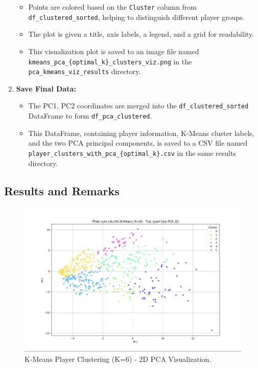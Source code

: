 \documentclass[12pt, a4paper]{report}
\begin{document}
\begin{enumerate}[label=\textbf{Step \arabic*:}, leftmargin=*]
\begin{itemize}
        \item Points are colored based on the \texttt{Cluster} column from \texttt{df\_clustered\_sorted}, helping to distinguish different player groups.
        \item The plot is given a title, axis labels, a legend, and a grid for readability.
        \item This visualization plot is saved to an image file named \texttt{kmeans\_pca\_\{optimal\_k\}\_clusters\_viz.png} in the \texttt{pca\_kmeans\_viz\_results} directory.
    \end{itemize}
    \item \textbf{Save Final Data:}
    \begin{itemize}
        \item The PC1, PC2 coordinates are merged into the \texttt{df\_clustered\_sorted} DataFrame to form \texttt{df\_pca\_clustered}.
        \item This DataFrame, containing player information, K-Means cluster labels, and the two PCA principal components, is saved to a CSV file named \texttt{player\_clusters\_with\_pca\_\{optimal\_k\}.csv} in the same results directory.
    \end{itemize}
\end{enumerate}

\subsection{Results and Remarks} %

\begin{figure}[H]
    \centering
    \includegraphics[width=\textwidth]{pca_kmeans.png}
    \caption{K-Means Player Clustering (K=6) - 2D PCA Visualization.}
    \label{fig:pca_kmeans_viz}
\end{figure}
\end{document}
